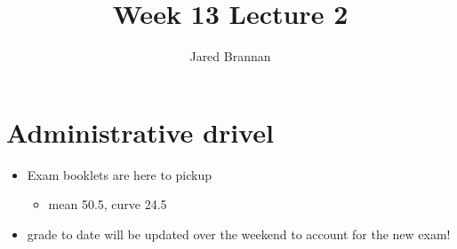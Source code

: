 \documentclass{article}
\title{Week 13 Lecture 2}
\author{Jared Brannan }
\theoremstyle{definition}
\begin{document}
\maketitle

\section{Administrative drivel}
\begin{itemize}
	\item Exam booklets are here to pickup
		\begin{itemize}
			\item mean 50.5, curve 24.5
		\end{itemize}
	\item grade to date will be updated over the weekend to account for the new exam!
\end{itemize}
\end{document}
